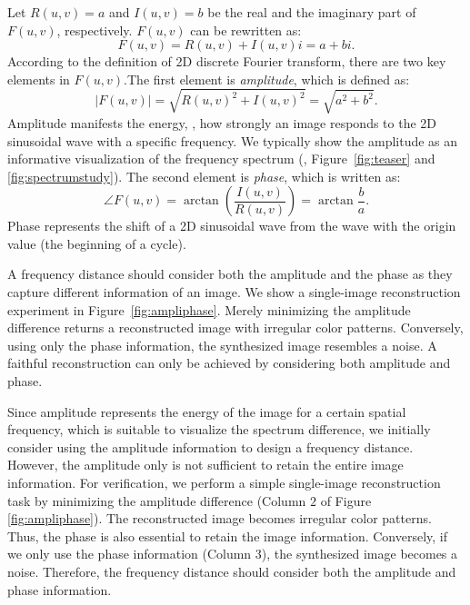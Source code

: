\documentclass[10pt,twocolumn,letterpaper]{article}
\begin{document}
Let $R\left(u,v\right)=a$ and $I\left(u,v\right)=b$ be the real and the imaginary part of $F\left(u,v\right)$, respectively. $F\left(u,v\right)$ can be rewritten as:
\begin{equation}
\label{eq:4}
    F\left(u,v\right)=R\left(u,v\right)+I\left(u,v\right)i=a+bi.
\end{equation}
According to the definition of 2D discrete Fourier transform, there are two key elements in $F\left(u,v\right)$.The first element is \textit{amplitude}, which is defined as:
\begin{equation}
\label{eq:5}
    \left|F\left(u,v\right)\right|=\sqrt{R\left(u,v\right)^2+I\left(u,v\right)^2}=\sqrt{a^2+b^2}.
\end{equation}
Amplitude manifests the energy, \ie, how strongly an image responds to the 2D sinusoidal wave with a specific frequency. We typically show the amplitude as an informative visualization of the frequency spectrum (\eg, Figure~\ref{fig:teaser} and \ref{fig:spectrumstudy}).
The second element is \textit{phase}, which is written as:
\begin{equation}
\label{eq:6}
    \angle F\left(u,v\right)=\arctan{\left(\frac{I\left(u,v\right)}{R\left(u,v\right)}\right)}=\arctan{\frac{b}{a}}.
\end{equation}
Phase represents the shift of a 2D sinusoidal wave from the wave with the origin value (the beginning of a cycle).

A frequency distance should consider both the amplitude and the phase as they capture different information of an image.
We show a single-image reconstruction experiment in Figure~\ref{fig:ampliphase}.
Merely minimizing the amplitude difference returns a reconstructed image with irregular color patterns.
Conversely, using only the phase information, the synthesized image resembles a noise.
A faithful reconstruction can only be achieved by considering both amplitude and phase.

Since amplitude represents the energy of the image for a certain spatial frequency, which is suitable to visualize the spectrum difference, we initially consider using the amplitude information to design a frequency distance.
However, the amplitude only is not sufficient to retain the entire image information.
For verification, we perform a simple single-image reconstruction task by minimizing the amplitude difference (Column $2$ of Figure \ref{fig:ampliphase}).
The reconstructed image becomes irregular color patterns.
Thus, the phase is also essential to retain the image information.
Conversely, if we only use the phase information (Column $3$), the synthesized image becomes a noise.
Therefore, the frequency distance should consider both the amplitude and phase information.
\fi
\end{document}
